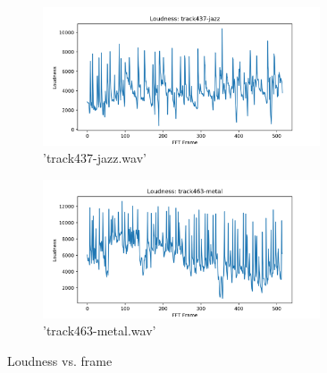 \documentclass[11pt,a4paper]{article}
\begin{document}
\begin{figure}[tb]\ContinuedFloat
	\begin{subfigure}[t]{\hsize}
		\centering
		\includegraphics[width=0.9\textwidth]{loudness_track437-jazz}
		\caption{'track437-jazz.wav'}
		\label{fig:loudness_jazz}
	\end{subfigure}
	\begin{subfigure}[t]{\hsize}
		\centering
		\includegraphics[width=0.9\textwidth]{loudness_track463-metal}
		\caption{'track463-metal.wav'}
		\label{fig:loudness_metal}
	\end{subfigure}
	\caption{Loudness vs. frame}
\end{figure}
\clearpage
\end{document}

